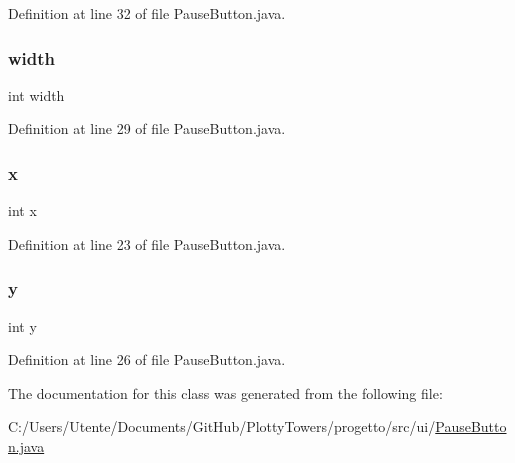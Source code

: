 Definition at line 32 of file Pause\+Button.\+java.

\mbox{\label{classui_1_1_pause_button_a2474a5474cbff19523a51eb1de01cda4}} 
\subsubsection{\texorpdfstring{width}{width}}
{\footnotesize\ttfamily int width\hspace{0.3cm}{\ttfamily [protected]}}



Definition at line 29 of file Pause\+Button.\+java.

\mbox{\label{classui_1_1_pause_button_a6150e0515f7202e2fb518f7206ed97dc}} 
\subsubsection{\texorpdfstring{x}{x}}
{\footnotesize\ttfamily int x\hspace{0.3cm}{\ttfamily [protected]}}



Definition at line 23 of file Pause\+Button.\+java.

\mbox{\label{classui_1_1_pause_button_a0a2f84ed7838f07779ae24c5a9086d33}} 
\subsubsection{\texorpdfstring{y}{y}}
{\footnotesize\ttfamily int y\hspace{0.3cm}{\ttfamily [protected]}}



Definition at line 26 of file Pause\+Button.\+java.



The documentation for this class was generated from the following file\+:\begin{DoxyCompactItemize}
\item 
C\+:/\+Users/\+Utente/\+Documents/\+Git\+Hub/\+Plotty\+Towers/progetto/src/ui/\hyperlink{_pause_button_8java}{Pause\+Button.\+java}\end{DoxyCompactItemize}

